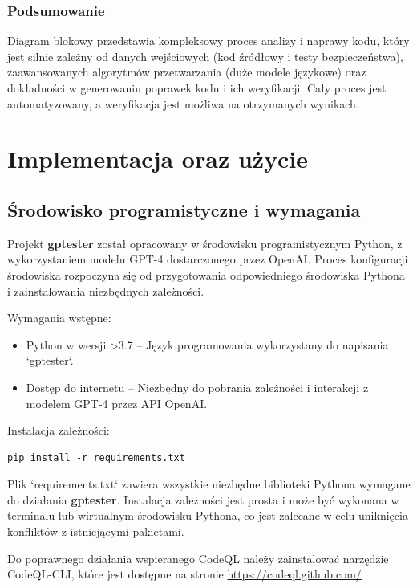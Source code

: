 \subsubsection{Podsumowanie}
Diagram blokowy przedstawia kompleksowy proces analizy i naprawy kodu, który jest silnie zależny od danych wejściowych (kod źródłowy i testy bezpieczeństwa), zaawansowanych algorytmów przetwarzania (duże modele językowe) oraz dokładności w generowaniu poprawek kodu i ich weryfikacji. Cały proces jest automatyzowany, a weryfikacja jest możliwa na otrzymanych wynikach.


\section{Implementacja oraz użycie}
\subsection{Środowisko programistyczne i wymagania}

Projekt \textbf{gptester} został opracowany w środowisku programistycznym Python, z wykorzystaniem modelu GPT-4 dostarczonego przez OpenAI. Proces konfiguracji środowiska rozpoczyna się od przygotowania odpowiedniego środowiska Pythona i zainstalowania niezbędnych zależności.

Wymagania wstępne:
\begin{itemize}
    \item Python w wersji >3.7 – Język programowania wykorzystany do napisania `gptester`.
    \item Dostęp do internetu – Niezbędny do pobrania zależności i interakcji z modelem GPT-4 przez API OpenAI.
\end{itemize}

Instalacja zależności:
\begin{listing}
    \begin{verbatim}
pip install -r requirements.txt
\end{verbatim}
\end{listing}

Plik `requirements.txt` zawiera wszystkie niezbędne biblioteki Pythona wymagane do działania \textbf{gptester}. 
Instalacja zależności jest prosta i może być wykonana w terminalu lub wirtualnym środowisku Pythona, co jest zalecane w celu uniknięcia konfliktów z istniejącymi pakietami.

Do poprawnego działania wspieranego CodeQL należy zainstalować narzędzie CodeQL-CLI, które jest dostępne na stronie \url{https://codeql.github.com/}
